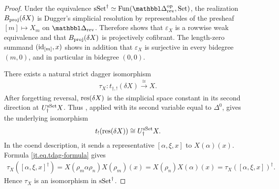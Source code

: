 \documentclass[a4paper,dvipdfmx,11pt]{amsart}
\begin{document}
\begin{proof}
  Under the equivalence $\sSet^{\dag}\simeq\Fun(\prism_{\rev}^{\myop},\Set)$, the realization $B_{\mathrm{proj}}(\delta X)$ is Dugger's simplicial resolution by representables of the presheaf $[m]\mapsto X_m$ on $\prism_{\rev}$.
  Therefore \cite[Lemma~2.7 and \S9.1]{DugUHT01} shows that $\varepsilon_X$ is a rowwise weak equivalence and that $B_{\mathrm{proj}}(\delta X)$ is projectively cofibrant.
  The length-zero summand $(\operatorname{id}_{[m]},x)$ shows in addition that $\varepsilon_X$ is surjective in every bidegree $(m,0)$, and in particular in bidegree $(0,0)$.

  There exists a natural strict dagger isomorphism
  \begin{align}
    \tau_X:t_{\dag,!}(\delta X)\xrightarrow{\cong}X.
  \end{align}
  After forgetting reversal, $\mathrm{res}(\delta X)$ is the simplicial space constant in its second direction at $U_{\dag}^{\mathrm{sSet}} X$.
  Thus \cite[Lemma~2.11]{JT06}, applied with its second variable equal to $\Delta^0$, gives the underlying isomorphism 
  \begin{align}
    t_!(\mathrm{res}(\delta X))\cong U_{\dag}^{\mathrm{sSet}} X.
  \end{align}
  In the coend description, it sends a representative $[\alpha,\xi,x]$ to $X(\alpha)(x)$.
  Formula \eqref{jt.eq.tdag-formula} gives
  \begin{align}
    \tau_X([\alpha,\xi,x]^{\dag})
    =
    X(\rho_m\alpha\rho_n)X(\rho_m)(x) 
    =
    X(\rho_n)X(\alpha)(x)
    =
    \tau_X([\alpha,\xi,x])^{\dag}.
  \end{align}
  Hence $\tau_{X}$ is an isomorphism in $\mathrm{sSet}^{\dag}$.


\end{proof}
\end{document}
